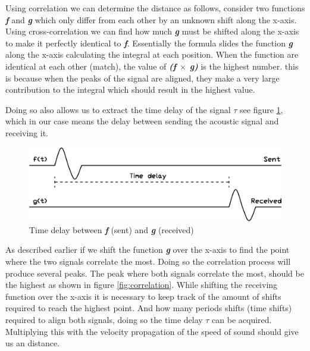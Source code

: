 \documentclass[10pt,a4paper]{article}
\begin{document}
Using correlation we can determine the distance as follows, consider two functions \textbf{\textit{f}} and \textbf{\textit{g}} which only differ from each other by an unknown shift along the x-axis. Using cross-correlation we can find how much \textbf{\textit{g}} must be shifted along the x-axis to make it perfectly identical to \textbf{\textit{f}}. Essentially the formula slides the function \textbf{\textit{g}} along the x-axis calculating the integral at each position. When the function are identical at each other (match), the value of \textbf{\textit{(f $\times$ g)}} is the highest number. this is because when the peaks of the signal are aligned, they make a very large contribution to the integral which should result in the highest value. 

Doing so also allows us to extract the time delay of the signal $\tau$ see figure \ref{fig:timedelay}, which in our case means the delay between sending the acoustic signal and receiving it.

\begin{figure}[H]
   \centering
   \includegraphics[width=\textwidth]{timedelay.pdf}
   \caption{Time delay between \textbf{\textit{f}} (sent) and  \textbf{\textit{g}} (received)}
   \label{fig:timedelay}
\end{figure}

As described earlier if we shift the function \textbf{\textit{g}} over the x-axis to find the point where the two signals correlate the most. Doing so the correlation process will produce several peaks. The peak where both signals correlate the most, should be the highest as shown in figure \ref{fig:correlation}. While shifting the receiving function over the x-axis it is necessary to keep track of the amount of shifts required to reach the highest point. And how many periods shifts (time shifts) required to align both signals, doing so the time delay $\tau$ can be acquired. Multiplying this with the velocity propagation of the speed of sound should give us an distance.
\end{document}
